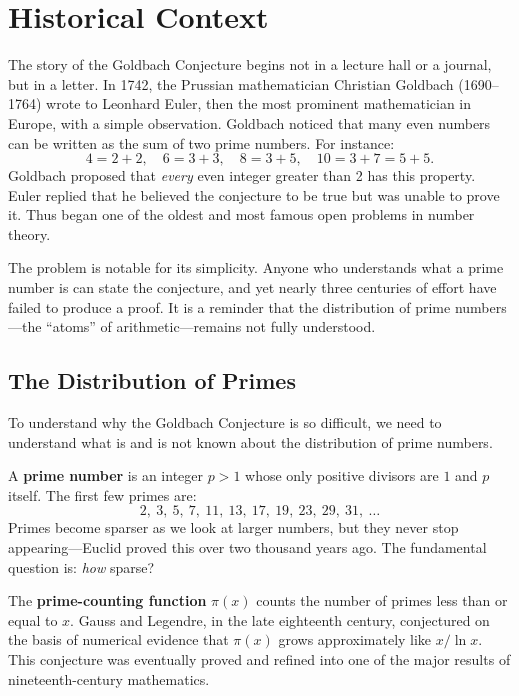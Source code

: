 \section{Historical Context}

The story of the Goldbach Conjecture begins not in a lecture hall or a journal, but in a letter. In 1742, the Prussian mathematician Christian Goldbach (1690--1764) wrote to Leonhard Euler, then the most prominent mathematician in Europe, with a simple observation. Goldbach noticed that many even numbers can be written as the sum of two prime numbers. For instance:
\[
    4 = 2 + 2, \quad 6 = 3 + 3, \quad 8 = 3 + 5, \quad 10 = 3 + 7 = 5 + 5.
\]
Goldbach proposed that \emph{every} even integer greater than 2 has this property. Euler replied that he believed the conjecture to be true but was unable to prove it. Thus began one of the oldest and most famous open problems in number theory.

The problem is notable for its simplicity. Anyone who understands what a prime number is can state the conjecture, and yet nearly three centuries of effort have failed to produce a proof. It is a reminder that the distribution of prime numbers---the ``atoms'' of arithmetic---remains not fully understood.

\subsection{The Distribution of Primes}

To understand why the Goldbach Conjecture is so difficult, we need to understand what is and is not known about the distribution of prime numbers.

A \textbf{prime number} is an integer $p > 1$ whose only positive divisors are $1$ and $p$ itself. The first few primes are:
\[
    2,\ 3,\ 5,\ 7,\ 11,\ 13,\ 17,\ 19,\ 23,\ 29,\ 31,\ \ldots
\]
Primes become sparser as we look at larger numbers, but they never stop appearing---Euclid proved this over two thousand years ago. The fundamental question is: \emph{how} sparse?

The \textbf{prime-counting function} $\pi(x)$ counts the number of primes less than or equal to $x$. Gauss and Legendre, in the late eighteenth century, conjectured on the basis of numerical evidence that $\pi(x)$ grows approximately like $x / \ln x$. This conjecture was eventually proved and refined into one of the major results of nineteenth-century mathematics.

